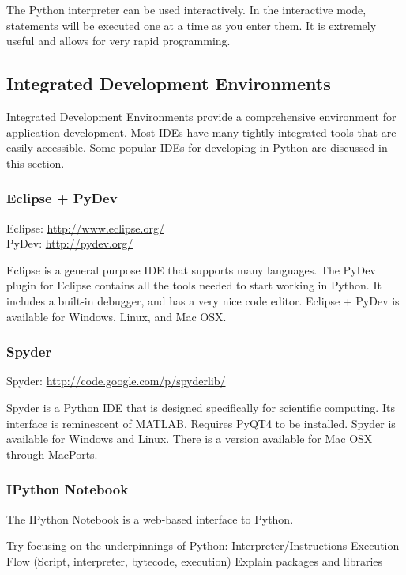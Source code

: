 The Python interpreter can be used interactively.  In the interactive mode, statements will be executed one at a time as you enter them.  It is extremely useful and allows for very rapid programming.

\subsection*{Integrated Development Environments}
Integrated Development Environments provide a comprehensive environment for application development.  Most IDEs have many tightly integrated tools that are easily accessible.  Some popular IDEs for developing in Python are discussed in this section.

\subsubsection*{Eclipse + PyDev}

Eclipse: \url{http://www.eclipse.org/} \\
PyDev: \url{http://pydev.org/}

Eclipse is a general purpose IDE that supports many languages.  The PyDev plugin for Eclipse contains all the tools needed to start working in Python.  It includes a built-in debugger, and has a very nice code editor.  Eclipse + PyDev is available for Windows, Linux, and Mac OSX.

\subsubsection*{Spyder}

Spyder: \url{http://code.google.com/p/spyderlib/}

Spyder is a Python IDE that is designed specifically for scientific computing.  Its interface is reminescent of MATLAB.  Requires PyQT4 to be installed.  Spyder is available for Windows and Linux.  There is a version available for Mac OSX through MacPorts.

\subsubsection*{IPython Notebook}
The IPython Notebook is a web-based interface to Python.


Try focusing on the underpinnings of Python:
Interpreter/Instructions
Execution Flow (Script, interpreter, bytecode, execution)
Explain packages and libraries
